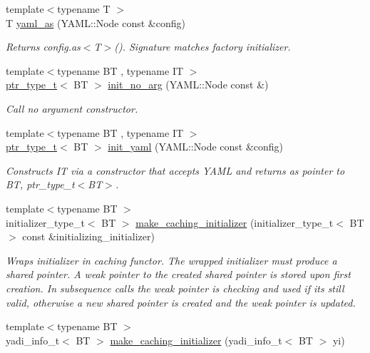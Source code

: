 \begin{DoxyCompactItemize}
{\footnotesize template$<$typename T $>$ }\\T \hyperlink{namespaceyadi_a8552ed4e9350993901558fb0db1e0906}{yaml\+\_\+as} (Y\+A\+M\+L\+::\+Node const \&config)
\begin{DoxyCompactList}\small\item\em Returns config.\+as$<$\+T$>$(). Signature matches factory initializer. \end{DoxyCompactList}\item 
{\footnotesize template$<$typename BT , typename IT $>$ }\\\hyperlink{namespaceyadi_a92290eb27cd90666aa87b17d854af9fe}{ptr\+\_\+type\+\_\+t}$<$ BT $>$ \hyperlink{namespaceyadi_a29e6a880477f8ed0163fbfc66aa6e5ba}{init\+\_\+no\+\_\+arg} (Y\+A\+M\+L\+::\+Node const \&)
\begin{DoxyCompactList}\small\item\em Call no argument constructor. \end{DoxyCompactList}\item 
{\footnotesize template$<$typename BT , typename IT $>$ }\\\hyperlink{namespaceyadi_a92290eb27cd90666aa87b17d854af9fe}{ptr\+\_\+type\+\_\+t}$<$ BT $>$ \hyperlink{namespaceyadi_afde7bc09c5c23344ded1f10f21386272}{init\+\_\+yaml} (Y\+A\+M\+L\+::\+Node const \&config)
\begin{DoxyCompactList}\small\item\em Constructs IT via a constructor that accepts Y\+A\+ML and returns as pointer to BT, ptr\+\_\+type\+\_\+t$<$\+B\+T$>$. \end{DoxyCompactList}\item 
{\footnotesize template$<$typename BT $>$ }\\initializer\+\_\+type\+\_\+t$<$ BT $>$ \hyperlink{namespaceyadi_a97efcea8efe1e35d98961c88e21d5b31}{make\+\_\+caching\+\_\+initializer} (initializer\+\_\+type\+\_\+t$<$ BT $>$ const \&initializing\+\_\+initializer)
\begin{DoxyCompactList}\small\item\em Wraps initializer in caching functor. The wrapped initializer must produce a shared pointer. A weak pointer to the created shared pointer is stored upon first creation. In subsequence calls the weak pointer is checking and used if it\textquotesingle{}s still valid, otherwise a new shared pointer is created and the weak pointer is updated. \end{DoxyCompactList}\item 
{\footnotesize template$<$typename BT $>$ }\\yadi\+\_\+info\+\_\+t$<$ BT $>$ \hyperlink{namespaceyadi_a71eac695c975b9f2b7f9d9611725b94e}{make\+\_\+caching\+\_\+initializer} (yadi\+\_\+info\+\_\+t$<$ BT $>$ yi)

\end{DoxyCompactItemize}
